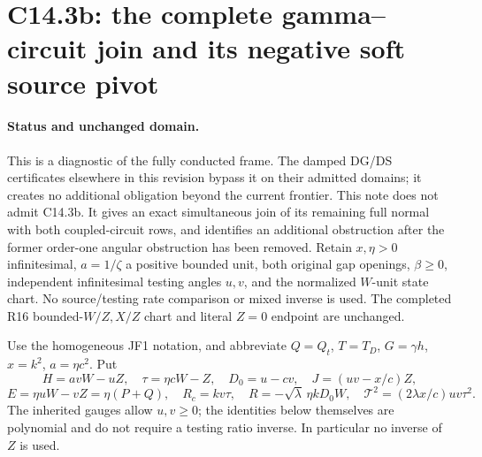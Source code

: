 \section{C14.3b: the complete gamma--circuit join and its negative soft source pivot}

\paragraph{Status and unchanged domain.}
This is a diagnostic of the fully conducted frame. The damped DG/DS
certificates elsewhere in this revision bypass it on their admitted
domains; it creates no additional obligation beyond the current frontier.
This note does not admit C14.3b. It gives an exact simultaneous join of
its remaining full normal with both coupled-circuit rows, and identifies
an additional obstruction after the former order-one angular obstruction
has been removed. Retain $x,\eta>0$ infinitesimal, $a=1/\zeta$ a positive
bounded unit, both original gap openings, $\beta\ge0$, independent
infinitesimal testing angles $u,v$, and the normalized $W$-unit state
chart. No source/testing rate comparison or mixed inverse is used.
The completed R16 bounded-$W/Z,X/Z$ chart and literal $Z=0$ endpoint
are unchanged.

Use the homogeneous JF1 notation, and abbreviate $Q=Q_t$, $T=T_D$,
$G=\gamma h$, $x=k^2$, $a=\eta c^2$. Put
\[
 H=avW-uZ,\quad \tau=\eta cW-Z,\quad D_0=u-cv,
 \quad J=(uv-x/c)Z,
\]
\[
 E=\eta uW-vZ=\eta(P+Q),\quad
 R_c=kv\tau,\quad R=-\sqrt\lambda\,\eta kD_0W,
 \quad \mathcal T^2=(2\lambda x/c)uv\tau^2.
\]
The inherited gauges allow $u,v\ge0$; the identities below themselves
are polynomial and do not require a testing ratio inverse. In
particular no inverse of $Z$ is used.

